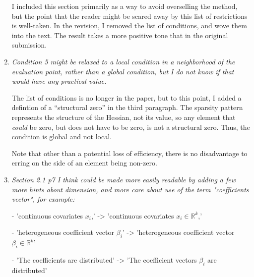 \documentclass{article}
\newcommand{\Real}[1]{\mathbb{R}^{#1}}
\newenvironment{revQuote}{\itshape}{\vspace{\baselineskip}}
\newenvironment{response}{\normalfont}{\vspace{\baselineskip}}
\begin{document}
\begin{enumerate}
\begin{revQuote}
  \end{revQuote}

  \begin{response}

I included this section primarily as a way to avoid overselling the
method, but the point that the reader might be scared away by this list of
restrictions is well-taken.  In the revision, I removed the list of
conditions, and wove them into the text.  The result takes a more
positive tone that in the original submission.

\end{response}

\item \begin{revQuote}
Condition 5 might be relaxed to a local condition in a neighborhood of
the evaluation point, rather than a global condition, but I do not know if
that would have any practical value.
  \end{revQuote}

\begin{response}

  The list of conditions is no longer in the paper, but to this point,
  I added a defintion of a ``structural zero'' in the third
  paragraph. The sparsity pattern represents the structure of the
  Hessian, not its value, so any element that \emph{could} be zero,
  but does not have to be zero, is not a structural zero.  Thus, the
  condition is global and not local.

  Note that other than
  a potential loss of efficiency, there is no disadvantage to erring
  on the side of an element being non-zero.  
\end{response}

\item \begin{revQuote}
Section 2.1 p7 I think could be made more easily readable by adding a few
more hints about dimension, and more care about use of the term 
"coefficients vector", for example:

  - 'continuous covariates $x_i$,' -> 'continuous covariates $x_i \in
\Real{k}$,'

  - 'heterogeneous coefficient vector $\beta_i$' -> 'heterogeneous
coefficient vector $\beta_i \in \Real{k}$'

  - 'The coefficients are distributed' -> 'The coefficient vectors
$\beta_i$ are distributed'


    
  \end{revQuote}


\end{enumerate}
\end{document}
